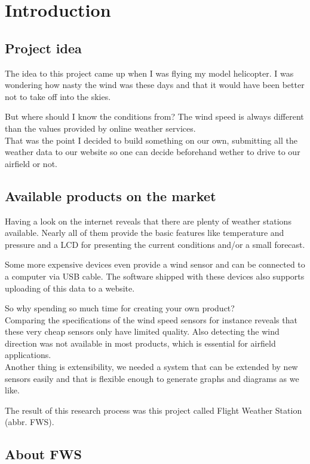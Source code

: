 
\chapter{Introduction}

\section{Project idea}
The idea to this project came up when I was flying my model helicopter. I was wondering how nasty the wind was these days and that it would have been better not to take off into the skies.

But where should I know the conditions from? The wind speed is always different than the values provided by online weather services.\\
That was the point I decided to build something on our own, submitting all the weather data to our website so one can decide beforehand wether to drive to our airfield or not.

\section{Available products on the market}
Having a look on the internet reveals that there are plenty of weather stations available. Nearly all of them provide the basic features like temperature and pressure and a LCD for presenting the current conditions and/or a small forecast.

Some more expensive devices even provide a wind sensor and can be connected to a computer via USB cable. The software shipped with these devices also supports uploading of this data to a website.

So why spending so much time for creating your own product?\\
Comparing the specifications of the wind speed sensors for instance reveals that these very cheap sensors only have limited quality. Also detecting the wind direction was not available in most products, which is essential for airfield applications.\\
Another thing is extensibility, we needed a system that can be extended by new sensors easily and that is flexible enough to generate graphs and diagrams as we like.

The result of this research process was this project called Flight Weather Station (abbr. FWS).

\section{About FWS} %
\label{sec:about_fws}

